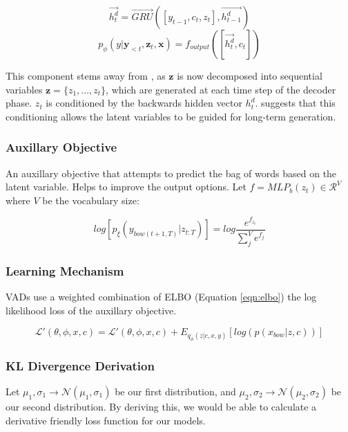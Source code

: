 \documentclass[12pt,twoside]{report}
\begin{document}
\begin{equation}
	\overrightarrow{h^d_t} = \overrightarrow{GRU}([y_{t-1},c_t,z_t], \overrightarrow{h^d_{t-1}})
\end{equation}
\begin{equation}
	p_\phi(y|\boldsymbol{y}_{<t},\boldsymbol{z}_t, \boldsymbol{x}) = f_{output}([\overrightarrow{h^d_t}, c_t])
\end{equation}

This component stems away from \cite{zhao_learning_2017}, as $\boldsymbol{z}$ is now decomposed into sequential variables $\boldsymbol{z} = \{z_1,...,z_t\}$, which are generated at each time step of the decoder phase. $z_t$ is conditioned by the backwards hidden vector $h^d_{t}$. \cite{du_variational_2018} suggests that this conditioning allows the latent variables to be guided for long-term generation.

\subsubsection{Auxillary Objective}

An auxillary objective that attempts to predict the bag of words based on the latent variable. Helps to improve the output options. Let $f=MLP_b(z_t) \in \mathcal{R}^V$ where $V$ be the vocabulary size:

\begin{equation}
	log [p_\xi(y_{bow(t+1,T)}|z_{t:T}) ] = log  \frac{e^{f_{z_{t}}}}{\sum^V_j e^{f_{j}}}
\end{equation}

\subsubsection{Learning Mechanism}

VADs use a weighted combination of ELBO (Equation \ref{eqn:elbo})  the log likelihood loss of the auxillary objective.

\begin{equation}
	\mathcal{L}'(\theta, \phi, x, c) =\mathcal{L}'(\theta, \phi, x, c) + E_{q_{\phi}(z|c,x,y)}[log(p(x_{bow}|z,c))]
\end{equation}

\subsubsection{KL Divergence Derivation}

Let $\mu_1, \sigma_1 \rightarrow \mathcal{N}(\mu_1,\sigma_1)$ be our first distribution, and $\mu_2, \sigma_2 \rightarrow \mathcal{N}(\mu_2,\sigma_2)$ be our second distribution. By deriving this, we would be able to calculate a derivative friendly loss function for our models.
\end{document}
